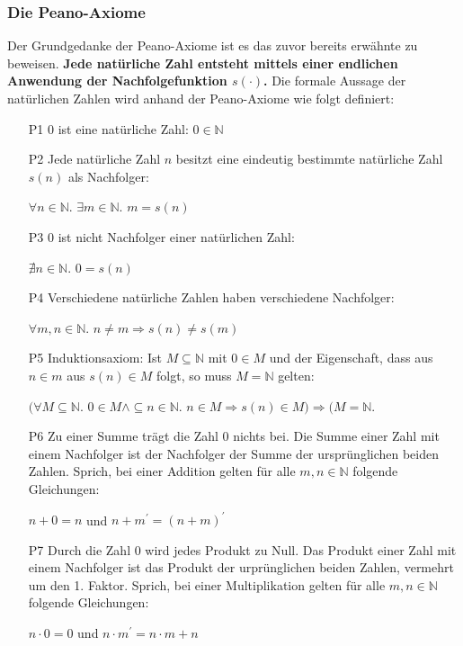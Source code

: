 \documentclass[12pt,a4paper]{article}
\theoremstyle{definition}
\begin{document}
\subsubsection{Die Peano-Axiome}\label{Die Peano-Axiome}
Der Grundgedanke der Peano-Axiome ist es das zuvor bereits erwähnte zu beweisen.
\textbf{Jede natürliche Zahl entsteht mittels einer endlichen Anwendung der Nachfolgefunktion $s(\cdot)$.}\newline
Die formale Aussage der natürlichen Zahlen wird anhand der Peano-Axiome wie folgt definiert:
\begin{itemize}
\item [P1] 0 ist eine natürliche Zahl: $0 \in \mathbb{N}$
\item [P2] Jede natürliche Zahl $n$ besitzt eine eindeutig bestimmte natürliche Zahl $s(n)$ als Nachfolger:
\begin{center}
$\forall n \in \mathbb{N}$. $\exists m \in \mathbb{N}$. $m = s(n)$
\end{center}
\item [P3] 0 ist nicht Nachfolger einer natürlichen Zahl:
\begin{center}
$\nexists n \in \mathbb{N}$. $0 = s(n)$
\end{center}
\item [P4] Verschiedene natürliche Zahlen haben verschiedene Nachfolger:
\begin{center}
$\forall m, n \in \mathbb{N}$. $n \neq m \Rightarrow s(n) \neq s(m)$
\end{center}
\item [P5] Induktionsaxiom: Ist $M \subseteq \mathbb{N}$ mit $0 \in M$ und der Eigenschaft, dass aus $n \in m$ aus $s(n) \in M$ folgt, so muss $M = \mathbb{N}$ gelten:
\begin{center}
$(\forall M \subseteq \mathbb{N}$. $0 \in M \land \subseteq n \in \mathbb{N}$. $n \in M \Rightarrow s(n) \in M) \Rightarrow (M = \mathbb{N}$.
\end{center}
\item [P6] Zu einer Summe trägt die Zahl 0 nichts bei.
Die Summe einer Zahl mit einem Nachfolger ist der Nachfolger der Summe der ursprünglichen beiden Zahlen.
Sprich, bei einer Addition gelten für alle $m, n \in \mathbb{N}$ folgende Gleichungen:
\begin{center}
$n + 0 = n$ und $n + m^\prime = (n + m)^\prime$
\end{center}
\item [P7] Durch die Zahl 0 wird jedes Produkt zu Null.
Das Produkt einer Zahl mit einem Nachfolger ist das Produkt der urprünglichen beiden Zahlen, vermehrt um den 1. Faktor.
Sprich, bei einer Multiplikation gelten für alle $m, n \in \mathbb{N}$ folgende Gleichungen:
\begin{center}
$n \cdot 0 = 0$ und $n \cdot m^\prime = n \cdot m + n$
\end{center}

\end{itemize}
\end{document}
